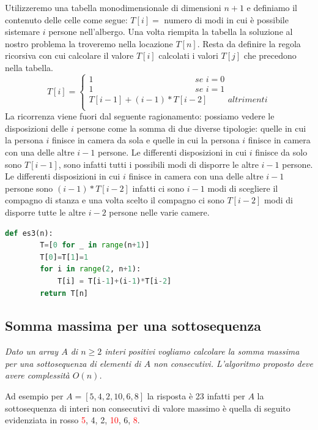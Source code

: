 Utilizzeremo una tabella monodimensionale di dimensioni $n+1$ e definiamo il contenuto delle celle come segue: $T[i] =$ numero di modi in cui è possibile sistemare $i$ persone nell’albergo. Una volta riempita la tabella la soluzione al nostro problema la troveremo nella locazione $T[n]$. Resta da definire la regola ricorsiva con cui calcolare il valore $T[i]$ calcolati i valori $T[j]$ che precedono nella tabella.
\begin{equation*}T[i]=
    \begin{cases}
        1\hspace{5cm}\textit{se } i=0\\
        1\hspace{5cm}\textit{se } i=1\\
        T[i-1]+(i-1)*T[i-2]\hspace{1cm}\textit{altrimenti}\\
    \end{cases}
\end{equation*}
La ricorrenza viene fuori dal seguente ragionamento: possiamo vedere le disposizioni delle $i$ persone come la somma di due diverse tipologie: quelle in cui la persona $i$ finisce in camera da sola e quelle in cui la persona $i$ finisce in camera con una delle altre $i-1$ persone. Le differenti disposizioni in cui $i$ finisce da solo sono $T[i - 1]$, sono infatti tutti i possibili modi di disporre le altre $i - 1$ persone. Le differenti disposizioni in cui $i$ finisce in camera con una delle altre $i-1$ persone sono $(i-1)*T[i-2]$ infatti ci sono $i-1$ modi di scegliere il compagno di stanza e una volta scelto il compagno ci sono $T[i - 2]$ modi di disporre tutte le altre $i - 2$ persone nelle varie camere.
\begin{lstlisting}[language=Python]
    def es3(n):
        T=[0 for _ in range(n+1)]
        T[0]=T[1]=1 
        for i in range(2, n+1):
            T[i] = T[i-1]+(i-1)*T[i-2]
        return T[n]
\end{lstlisting}

\subsection{Somma massima per una sottosequenza}
\textit{Dato un array $A$ di $n\geq 2$ interi positivi vogliamo calcolare la somma massima per una sottosequenza di elementi di $A$ non consecutivi. L'algoritmo proposto deve avere complessità $O(n)$.}

Ad esempio per $A = [5, 4, 2, 10, 6, 8]$ la risposta è 23 infatti per $A$ la sottosequenza di interi non consecutivi di valore massimo è quella di seguito evidenziata in rosso \textcolor{red}{5}, 4, 2, \textcolor{red}{10}, 6, \textcolor{red}{8}.

